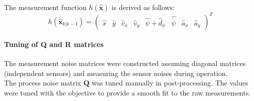 The measurement function $h(\hat{\bm{x}})$ is derived as follows:
\begin{equation}
h(\hat{\bm{x}}_{k|k-1})=\begin{pmatrix}\hat x&\hat y&\hat v_x&\hat v_y&\hat \psi+\hat d_\psi&\hat{\dot\psi}&\hat a_x&\hat a_y\end{pmatrix}^T
\end{equation}
\paragraph{Tuning of Q and R matrices}
The measurement noise matrices were constructed assuming diagonal matrices (independent sensors) and measuring the sensor noises during operation.\\
The process noise matrix $\bm{Q}$ was tuned manually in post-processing. The values were tuned with the objective to provide a smooth fit to the raw measurements.
